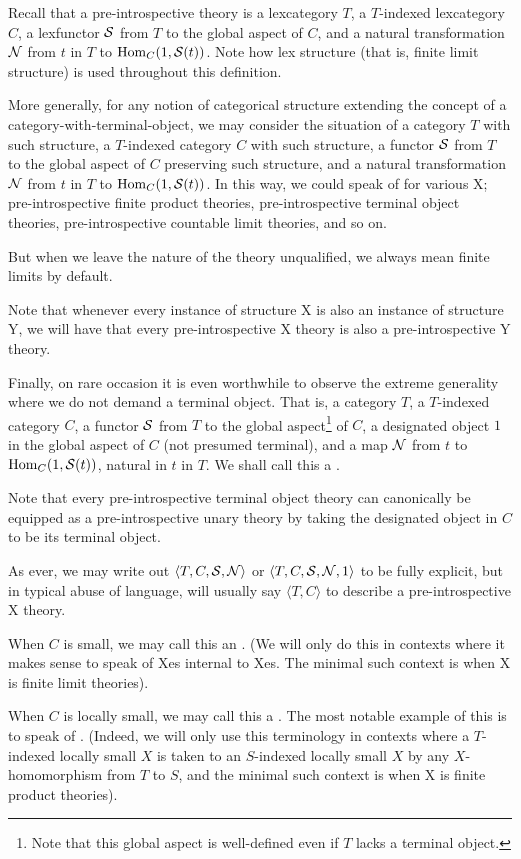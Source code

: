 \documentclass[./main.tex]{subfiles}
\begin{document}
\begin{definition}\label{DefnPreIntrospSNGeneralized}
Recall that a pre-introspective theory is a lexcategory $T$, a $T$-indexed lexcategory $C$, a lexfunctor $\mathcal{S}$ from $T$ to the global aspect of $C$, and a natural transformation $\mathcal{N}$ from $t$ in $T$ to $\operatorname{Hom}_C(1, \mathcal{S}(t))$. Note how lex structure (that is, finite limit structure) is used throughout this definition.

More generally, for any notion of categorical structure extending the concept of a category-with-terminal-object, we may consider the situation of a category $T$ with such structure, a $T$-indexed category $C$ with such structure, a functor $\mathcal{S}$ from $T$ to the global aspect of $C$ preserving such structure, and a natural transformation $\mathcal{N}$ from $t$ in $T$ to $\operatorname{Hom}_C(1, \mathcal{S}(t))$. In this way, we could speak of  for various X; pre-introspective finite product theories, pre-introspective terminal object theories, pre-introspective countable limit theories, and so on.

But when we leave the nature of the theory unqualified, we always mean finite limits by default.

Note that whenever every instance of structure X is also an instance of structure Y, we will have that every pre-introspective X theory is also a pre-introspective Y theory.

Finally, on rare occasion it is even worthwhile to observe the extreme generality where we do not demand a terminal object. That is, a category $T$, a $T$-indexed category $C$, a functor $\mathcal{S}$ from $T$ to the global aspect\footnote{Note that this global aspect is well-defined even if $T$ lacks a terminal object.} of $C$, a designated object $1$ in the global aspect of $C$ (not presumed terminal), and a map $\mathcal{N}$ from $t$ to $\operatorname{Hom}_C(1, \mathcal{S}(t))$, natural in $t$ in $T$. We shall call this a .

Note that every pre-introspective terminal object theory can canonically be equipped as a pre-introspective unary theory by taking the designated object in $C$ to be its terminal object.

As ever, we may write out $\langle T, C, \mathcal{S}, \mathcal{N} \rangle$ or $\langle T, C, \mathcal{S}, \mathcal{N}, 1 \rangle$ to be fully explicit, but in typical abuse of language, will usually say $\langle T, C \rangle$ to describe a pre-introspective X theory.

When $C$ is small, we may call this an . (We will only do this in contexts where it makes sense to speak of Xes internal to Xes. The minimal such context is when X is finite limit theories). 

When $C$ is locally small, we may call this a . The most notable example of this is to speak of . (Indeed, we will only use this terminology in contexts where a $T$-indexed locally small $X$ is taken to an $S$-indexed locally small $X$ by any $X$-homomorphism from $T$ to $S$, and the minimal such context is when X is finite product theories).
\end{definition}
\end{document}
